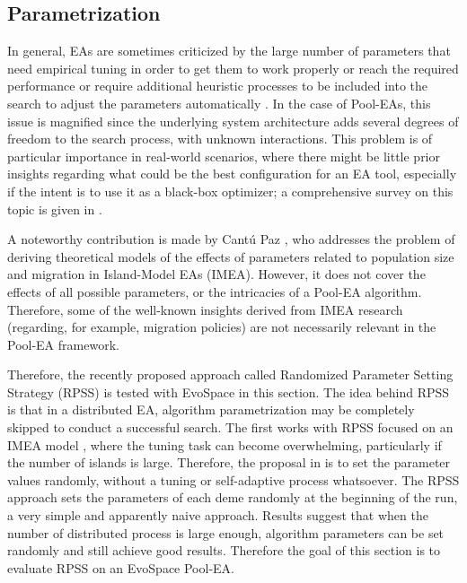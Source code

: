\subsection{Parametrization}
In general, EAs are sometimes criticized by the large number of
parameters that need empirical tuning in order to get them to work properly or
reach the required performance or require additional heuristic processes to be included into the search to
adjust the parameters automatically \cite{parameters,ss}.
In the case of Pool-EAs, this issue is magnified since the underlying system architecture adds several degrees of freedom to the search process,
with unknown interactions.
This problem is of particular importance in real-world scenarios, where there might be little prior insights regarding what could be the best
configuration for an EA tool, especially if the intent is to use it as a black-box optimizer;
a comprehensive survey on this topic is given in \cite{parameters}. 

A noteworthy contribution is made by Cant\'u Paz \cite{cantu}, who addresses the problem of deriving theoretical models of the effects
of parameters related to population size and migration in Island-Model EAs (IMEA).
However, it does not cover the effects of all possible parameters, or the intricacies of a Pool-EA algorithm.
Therefore, some of the well-known insights derived from IMEA research (regarding, for example, migration policies)
are not necessarily relevant in the Pool-EA framework.

Therefore, the recently proposed approach called Randomized Parameter Setting Strategy (RPSS) \cite{fuku1,fuku2}
is tested with EvoSpace in this section.
The idea behind RPSS is that in a distributed EA, algorithm parametrization may be completely skipped to conduct a successful search.
The first works with RPSS focused on an IMEA model \cite{fuku1,fuku2},
where the tuning task can become overwhelming, particularly if the number of islands is large.
Therefore, the proposal in \cite{fuku1} is to set the parameter values randomly, without a tuning or self-adaptive process whatsoever.
The RPSS approach sets the parameters of each deme randomly at the beginning of the run, a very simple and apparently naive approach.
Results suggest that when the number of distributed process is large enough, algorithm parameters can be set randomly and still achieve
good results.
Therefore the goal of this section is to evaluate RPSS on an EvoSpace Pool-EA.

